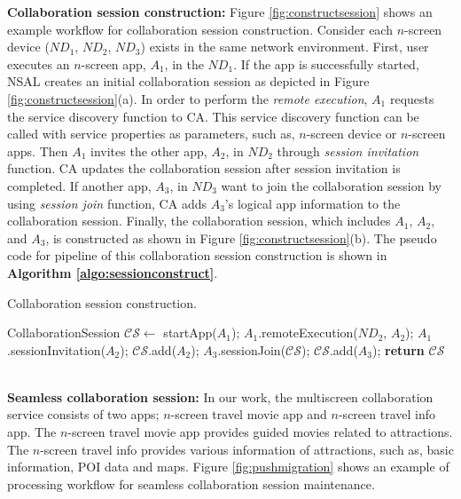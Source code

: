 \documentclass[conference]{IEEEtran}
\begin{document}
\noindent
\textbf{Collaboration session construction:}  Figure \ref{fig:constructsession} shows an example workflow for collaboration session construction. Consider each $n$-screen device ($ND_1$, $ND_2$, $ND_3$)  exists in the same network environment. 
First, user executes an $n$-screen app, $A_1$, in the $ND_1$. If the app is successfully started, NSAL creates an initial collaboration session as depicted in Figure \ref{fig:constructsession}(a). In order to perform the \textit{remote execution}, $A_1$ requests the service discovery function to CA.  This service discovery function can be called with service properties as parameters, such as, $n$-screen device or $n$-screen apps. Then $A_1$ invites the other app, $A_2$, in $ND_2$ through \textit{session invitation} function. CA updates the collaboration session after session invitation is completed. If another app, $A_3$, in $ND_3$ want to join the collaboration session by using \textit{session join} function, CA adds $A_3$'s logical app information to the collaboration session. Finally, the collaboration session, which includes $A_1$, $A_2$, and $A_3$, is constructed as shown in Figure \ref{fig:constructsession}(b). 
The pseudo code for pipeline of this collaboration session construction is shown in \textbf{Algorithm \ref{algo:sessionconstruct}}.
    \begin{algorithm}
    \caption{Collaboration session construction.}
    \label{algo:sessionconstruct}
    \begin{algorithmic}[1]
       \State CollaborationSession $\mathcal{CS} \gets$ startApp($A_1$);
       \State $A_1$.remoteExecution($ND_2$, $A_2$);
       \State $A_1$.sessionInvitation($A_2$);
       \State $\mathcal{CS}$.add($A_2$);
       \State $A_3$.sessionJoin($\mathcal{CS}$);
       \State $\mathcal{CS}$.add($A_3$);
       \State \textbf{return} $\mathcal{CS}$
    \EndProcedure
    \end{algorithmic}
    \end{algorithm}
\\

\noindent
\textbf{Seamless collaboration session:}  
In our work, the multiscreen collaboration service consists of two apps; $n$-screen travel movie app and $n$-screen travel info app. 
The $n$-screen travel movie app provides guided movies related to attractions. 
The $n$-screen travel info provides various information of attractions, such as, basic information, POI data and maps.
Figure \ref{fig:pushmigration} shows an example of processing workflow  for seamless collaboration session maintenance. 
\end{document}

